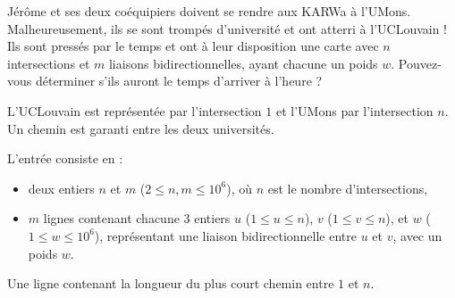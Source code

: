 \problemname{\problemyamlname}



Jérôme et ses deux coéquipiers doivent se rendre aux KARWa à l'UMons.
Malheureusement, ils se sont trompés d'université et ont atterri à l'UCLouvain !
Ils sont pressés par le temps et ont à leur disposition une carte avec $n$ intersections et $m$ liaisons bidirectionnelles, ayant chacune un poids $w$.
Pouvez-vous déterminer s'ils auront le temps d'arriver à l'heure ?

L'UCLouvain est représentée par l'intersection $1$ et l'UMons par l'intersection $n$.
Un chemin est garanti entre les deux universités.

\begin{Input}
	L'entrée consiste en :
	\begin{itemize}
		\item deux entiers $n$ et $m$ ($2 \le n, m \le 10^6$), où $n$ est le nombre d'intersections,
		\item $m$ lignes contenant chacune 3 entiers $u$ ($1 \le u \le n$), $v$ ($1 \le v \le n$), et $w$ ($1 \le w \le 10^6$), représentant une liaison bidirectionnelle entre $u$ et $v$, avec un poids $w$.
	\end{itemize}
\end{Input}

\begin{Output}
	Une ligne contenant la longueur du plus court chemin entre $1$ et $n$.
\end{Output}
